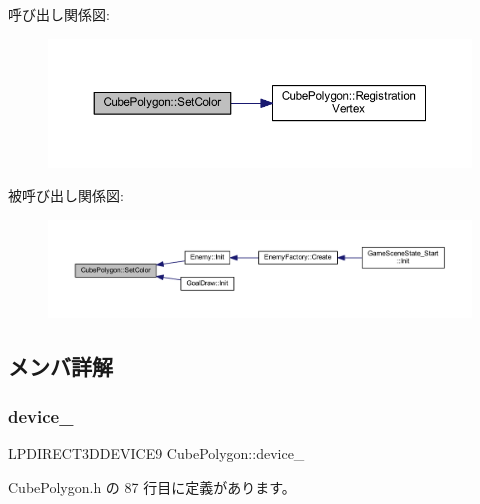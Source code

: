 呼び出し関係図\+:\nopagebreak
\begin{figure}[H]
\begin{center}
\leavevmode
\includegraphics[width=350pt]{class_cube_polygon_acf6a30c30c22dd887ed570db6cbe285d_cgraph}
\end{center}
\end{figure}
被呼び出し関係図\+:\nopagebreak
\begin{figure}[H]
\begin{center}
\leavevmode
\includegraphics[width=350pt]{class_cube_polygon_acf6a30c30c22dd887ed570db6cbe285d_icgraph}
\end{center}
\end{figure}


\subsection{メンバ詳解}
\mbox{\label{class_cube_polygon_a769fe3f6b4695d5bf4823489b76ea805}} 
\subsubsection{\texorpdfstring{device\+\_\+}{device\_}}
{\footnotesize\ttfamily L\+P\+D\+I\+R\+E\+C\+T3\+D\+D\+E\+V\+I\+C\+E9 Cube\+Polygon\+::device\+\_\+\hspace{0.3cm}{\ttfamily [private]}}



 Cube\+Polygon.\+h の 87 行目に定義があります。

\mbox{\label{class_cube_polygon_ac1405f52ed52453068575f2fb8d420a5}} 
